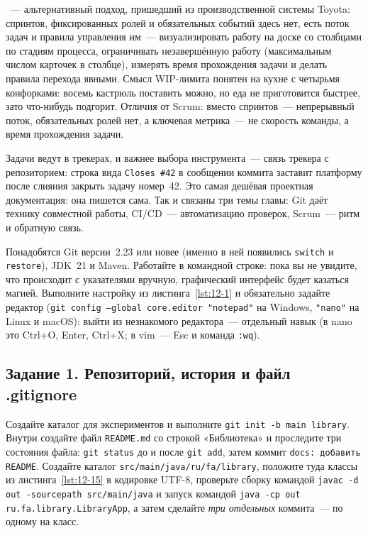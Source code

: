 ~--- альтернативный подход, пришедший из производственной системы Toyota: спринтов, фиксированных ролей и обязательных событий здесь нет, есть поток задач и правила управления им~--- визуализировать работу на доске со столбцами по стадиям процесса, ограничивать незавершённую работу  (максимальным числом карточек в столбце), измерять время прохождения задачи и делать правила перехода явными. Смысл WIP-лимита понятен на кухне с четырьмя конфорками: восемь кастрюль поставить можно, но еда не приготовится быстрее, зато что-нибудь подгорит. Отличия от Scrum: вместо спринтов~--- непрерывный поток, обязательных ролей нет, а ключевая метрика~--- не скорость команды, а время прохождения задачи.

Задачи ведут в трекерах, и важнее выбора инструмента~--- связь трекера с репозиторием: строка вида \texttt{Closes \#42} в сообщении коммита заставит платформу после слияния закрыть задачу номер~42. Это самая дешёвая проектная документация: она пишется сама. Так и связаны три темы главы: Git даёт технику совместной работы, CI/CD~--- автоматизацию проверок, Scrum~--- ритм и обратную связь.

\praktikum{}

Понадобятся Git версии~2.23 или новее (именно в ней появились \texttt{switch} и \texttt{restore}), JDK~21 и Maven. Работайте в командной строке: пока вы не увидите, что происходит с указателями вручную, графический интерфейс будет казаться магией. Выполните настройку из листинга~\ref{lst:12-1} и обязательно задайте редактор (\texttt{git config --global core.editor "notepad"} на Windows, \texttt{"nano"} на Linux и macOS): выйти из незнакомого редактора~--- отдельный навык (в nano это Ctrl+O, Enter, Ctrl+X; в vim~--- Esc и команда \texttt{:wq}).

\subsection*{Задание 1. Репозиторий, история и файл .gitignore}

Создайте каталог для экспериментов и выполните \texttt{git init -b main library}. Внутри создайте файл \texttt{README.md} со строкой «Библиотека» и проследите три состояния файла: \texttt{git status} до и после \texttt{git add}, затем коммит \texttt{docs: добавить README}. Создайте каталог \texttt{src/main/java/ru/fa/library}, положите туда классы из листинга~\ref{lst:12-15} в кодировке UTF-8, проверьте сборку командой \texttt{javac -d out -sourcepath src/main/java} и запуск командой \texttt{java -cp out ru.fa.library.LibraryApp}, а затем сделайте \emph{три отдельных} коммита~--- по одному на класс.

